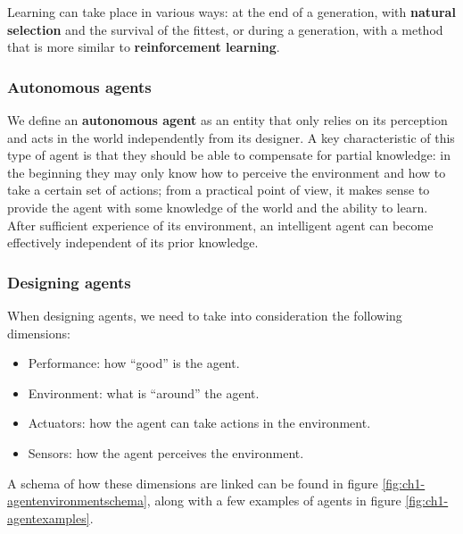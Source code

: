 Learning can take place in various ways: at the end of a generation, with \textbf{natural selection} and the survival of the fittest, or during a generation, with a method that is more similar to \textbf{reinforcement learning}.

\subsubsection{Autonomous agents}
We define an \textbf{autonomous agent} as an entity that only relies on its perception and acts in the world independently from its designer. A key characteristic of this type of agent is that they should be able to compensate for partial knowledge: in the beginning they may only know how to perceive the environment and how to take a certain set of actions; from a practical point of view, it makes sense to provide the agent with some knowledge of the world and the ability to learn. After sufficient experience of its environment, an intelligent agent can become effectively independent of its prior knowledge.

\subsubsection{Designing agents}
When designing agents, we need to take into consideration the following dimensions:

\begin{itemize}
    \item Performance: how ``good'' is the agent.
    \item Environment: what is ``around'' the agent.
    \item Actuators: how the agent can take actions in the environment.
    \item Sensors: how the agent perceives the environment.
\end{itemize}

A schema of how these dimensions are linked can be found in figure \ref{fig:ch1-agentenvironmentschema}, along with a few examples of agents in figure \ref{fig:ch1-agentexamples}.

